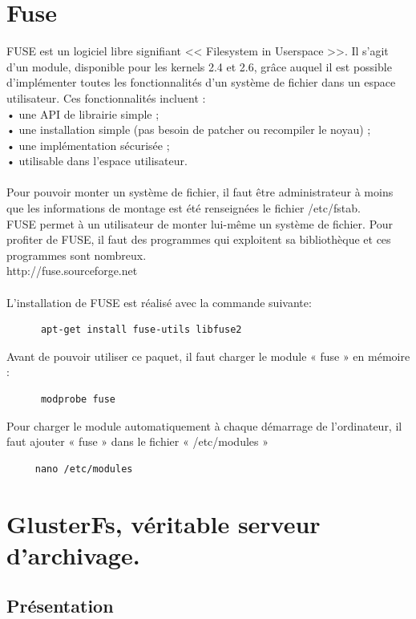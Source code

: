 \documentclass[12pt]{report}
\begin{document}
	  \chapter{Fuse}
    FUSE est un logiciel libre signifiant << Filesystem in Userspace >>. Il s'agit d'un module, disponible pour les kernels 2.4 et 2.6, grâce auquel 
    il est possible d'implémenter toutes les fonctionnalités d'un système de fichier dans un espace utilisateur. Ces fonctionnalités incluent :\\
   • une API de librairie simple ;\\
   • une installation simple (pas besoin de patcher ou recompiler le noyau) ;\\
   • une implémentation sécurisée ;\\
   • utilisable dans l'espace utilisateur.\\\\
    Pour pouvoir monter un système de fichier, il faut être administrateur à moins que les informations de montage est été renseignées le fichier 
    /etc/fstab.\\
    FUSE permet à un utilisateur de monter lui-même un système de fichier. Pour profiter de FUSE, il faut des programmes qui exploitent sa bibliothèque
    et  ces programmes sont nombreux.\\
    http://fuse.sourceforge.net\\\\
    L'installation de FUSE est réalisé avec la commande suivante:\\
    \begin{lstlisting}
	  apt-get install fuse-utils libfuse2
	  \end{lstlisting}
    Avant de pouvoir utiliser ce paquet, il faut charger le module « fuse » en mémoire :\\
    \begin{lstlisting}
	  modprobe fuse
	  \end{lstlisting}
    Pour charger le module automatiquement à chaque démarrage de l’ordinateur, il faut ajouter « fuse » dans le fichier « /etc/modules »\\
    \begin{lstlisting}
	 nano /etc/modules
	 \end{lstlisting}
	\chapter{GlusterFs, véritable serveur d'archivage.}
		\section{Présentation}
\end{document}
